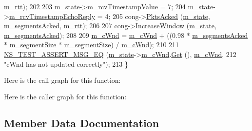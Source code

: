 \begin{DoxyCode}
      \hyperlink{classTcpLedbatIncrementTest_a843cb713ab4901fa84ee69d64ad4aac6}{m\_rtt});
202 
203   \hyperlink{classTcpLedbatIncrementTest_ac357e24b111ad8cad0098877e8beb98e}{m\_state}->\hyperlink{classns3_1_1TcpSocketState_af590aa7004c1b09e4e20defd75a7e84a}{m\_rcvTimestampValue} = 7;
204   \hyperlink{classTcpLedbatIncrementTest_ac357e24b111ad8cad0098877e8beb98e}{m\_state}->\hyperlink{classns3_1_1TcpSocketState_a930be195736a97e37b7a1f92360b6261}{m\_rcvTimestampEchoReply} = 4;
205   cong->\hyperlink{classns3_1_1TcpLedbat_adc44a91826f2080c5551a313648d3848}{PktsAcked} (\hyperlink{classTcpLedbatIncrementTest_ac357e24b111ad8cad0098877e8beb98e}{m\_state}, \hyperlink{classTcpLedbatIncrementTest_a3335fb51edf1a6f05f4f55e12ab6409f}{m\_segmentsAcked}, 
      \hyperlink{classTcpLedbatIncrementTest_a843cb713ab4901fa84ee69d64ad4aac6}{m\_rtt});
206 
207   cong->\hyperlink{classns3_1_1TcpLedbat_a9baf3c7c8d5572c3cf7c4249a2833748}{IncreaseWindow} (\hyperlink{classTcpLedbatIncrementTest_ac357e24b111ad8cad0098877e8beb98e}{m\_state}, \hyperlink{classTcpLedbatIncrementTest_a3335fb51edf1a6f05f4f55e12ab6409f}{m\_segmentsAcked});
208 
209   \hyperlink{classTcpLedbatIncrementTest_a3f444c4f93c7968b034972239324a7d5}{m\_cWnd} = \hyperlink{classTcpLedbatIncrementTest_a3f444c4f93c7968b034972239324a7d5}{m\_cWnd} + ((0.98 * \hyperlink{classTcpLedbatIncrementTest_a3335fb51edf1a6f05f4f55e12ab6409f}{m\_segmentsAcked} * 
      \hyperlink{classTcpLedbatIncrementTest_a5cd6fa8c5676d842df33b20100c75397}{m\_segmentSize} * \hyperlink{classTcpLedbatIncrementTest_a5cd6fa8c5676d842df33b20100c75397}{m\_segmentSize}) / \hyperlink{classTcpLedbatIncrementTest_a3f444c4f93c7968b034972239324a7d5}{m\_cWnd});
210 
211   \hyperlink{group__testing_ga2a9d78cffb3db8e867c35fff0b698cf5}{NS\_TEST\_ASSERT\_MSG\_EQ} (\hyperlink{classTcpLedbatIncrementTest_ac357e24b111ad8cad0098877e8beb98e}{m\_state}->\hyperlink{classns3_1_1TcpSocketState_a7cd3d2156a483c1db436097477a0fd7f}{m\_cWnd}.\hyperlink{classns3_1_1TracedValue_a10fddd1de961ac65acfbeb440a1e8551}{Get} (), 
      \hyperlink{classTcpLedbatIncrementTest_a3f444c4f93c7968b034972239324a7d5}{m\_cWnd},
212                          \textcolor{stringliteral}{"cWnd has not updated correctly"});
213 \}
\end{DoxyCode}


Here is the call graph for this function\+:




Here is the caller graph for this function\+:




\subsection{Member Data Documentation}
